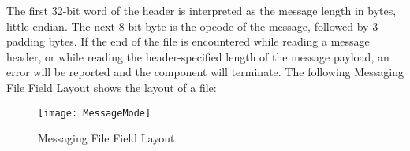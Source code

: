 The first 32-bit word of the header is interpreted as the message length in bytes, little-endian. The next 8-bit byte is the opcode of the message, followed by 3 padding bytes.
If the end of the file is encountered while reading a message header, or while reading
the header-specified length of the message payload, an error will be reported and the
component will terminate.  The following Messaging File Field Layout shows the layout of a file: 

\begin{figure}[ht]
	\centerline{\texttt{[image: MessageMode]}}
	\caption{Messaging File Field Layout}
\end{figure}